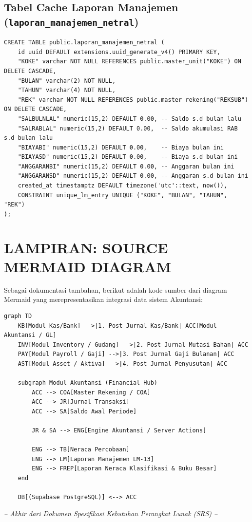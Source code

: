 \documentclass[11pt,a4paper]{article}
\begin{document}
\subsection{Tabel Cache Laporan Manajemen (\texttt{laporan\_manajemen\_netral})}
\begin{lstlisting}[caption={DDL Cache Laporan Manajemen (LNET)}]
CREATE TABLE public.laporan_manajemen_netral (
    id uuid DEFAULT extensions.uuid_generate_v4() PRIMARY KEY,
    "KOKE" varchar NOT NULL REFERENCES public.master_unit("KOKE") ON DELETE CASCADE,
    "BULAN" varchar(2) NOT NULL,
    "TAHUN" varchar(4) NOT NULL,
    "REK" varchar NOT NULL REFERENCES public.master_rekening("REKSUB") ON DELETE CASCADE,
    "SALBULNLAL" numeric(15,2) DEFAULT 0.00, -- Saldo s.d bulan lalu
    "SALRABLAL" numeric(15,2) DEFAULT 0.00,  -- Saldo akumulasi RAB s.d bulan lalu
    "BIAYABI" numeric(15,2) DEFAULT 0.00,    -- Biaya bulan ini
    "BIAYASD" numeric(15,2) DEFAULT 0.00,    -- Biaya s.d bulan ini
    "ANGGARANBI" numeric(15,2) DEFAULT 0.00, -- Anggaran bulan ini
    "ANGGARANSD" numeric(15,2) DEFAULT 0.00, -- Anggaran s.d bulan ini
    created_at timestamptz DEFAULT timezone('utc'::text, now()),
    CONSTRAINT unique_lm_entry UNIQUE ("KOKE", "BULAN", "TAHUN", "REK")
);
\end{lstlisting}

\newpage

\section{LAMPIRAN: SOURCE MERMAID DIAGRAM}
Sebagai dokumentasi tambahan, berikut adalah kode sumber dari diagram Mermaid yang merepresentasikan integrasi data sistem Akuntansi:

\begin{lstlisting}[caption={Kode Sumber Diagram Mermaid Integrasi}]
graph TD
    KB[Modul Kas/Bank] -->|1. Post Jurnal Kas/Bank| ACC[Modul Akuntansi / GL]
    INV[Modul Inventory / Gudang] -->|2. Post Jurnal Mutasi Bahan| ACC
    PAY[Modul Payroll / Gaji] -->|3. Post Jurnal Gaji Bulanan| ACC
    AST[Modul Asset / Aktiva] -->|4. Post Jurnal Penyusutan| ACC

    subgraph Modul Akuntansi (Financial Hub)
        ACC --> COA[Master Rekening / COA]
        ACC --> JR[Jurnal Transaksi]
        ACC --> SA[Saldo Awal Periode]
        
        JR & SA --> ENG[Engine Akuntansi / Server Actions]
        
        ENG --> TB[Neraca Percobaan]
        ENG --> LM[Laporan Manajemen LM-13]
        ENG --> FREP[Laporan Neraca Klasifikasi & Buku Besar]
    end

    DB[(Supabase PostgreSQL)] <--> ACC
\end{lstlisting}

\vspace{2cm}
\begin{center}
    \color{gray}\textit{-- Akhir dari Dokumen Spesifikasi Kebutuhan Perangkat Lunak (SRS) --}
\end{center}
\end{document}
